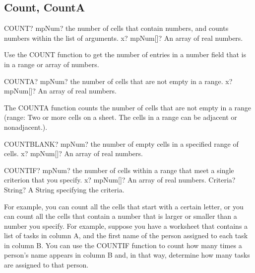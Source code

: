 \subsection{Count, CountA}

\begin{mpFunctionsExtract}
	\mpWorksheetFunctionOneNotImplemented
	{COUNT? mpNum? the number of cells that contain numbers, and counts numbers within the list of arguments.}
	{x? mpNum[]? An array of real numbers.}
\end{mpFunctionsExtract}

\vspace{0.3cm}
Use the \textsf{COUNT} function to get the number of entries in a number field that is in a range or array of numbers.


\vspace{0.6cm}
\begin{mpFunctionsExtract}
	\mpWorksheetFunctionOneNotImplemented
	{COUNTA? mpNum? the number of cells that are not empty in a range.}
	{x? mpNum[]? An array of real numbers.}
\end{mpFunctionsExtract}

\vspace{0.3cm}
The \textsf{COUNTA} function counts the number of cells that are not empty in a range (range: Two or more cells on a sheet. The cells in a range can be adjacent or nonadjacent.).


\vspace{0.6cm}
\begin{mpFunctionsExtract}
	\mpWorksheetFunctionOneNotImplemented
	{COUNTBLANK? mpNum? the number of empty cells in a specified range of cells.}
	{x? mpNum[]? An array of real numbers.}
\end{mpFunctionsExtract}



\vspace{0.6cm}
\begin{mpFunctionsExtract}
	\mpWorksheetFunctionTwoNotImplemented
	{COUNTIF? mpNum? the number of cells within a range that meet a single criterion that you specify.}
	{x? mpNum[]? An array of real numbers.}
	{Criteria? String? A String specifying the criteria.}
\end{mpFunctionsExtract}

\vspace{0.3cm}
For example, you can count all the cells that start with a certain letter, or you can count all the cells that contain a number that is larger or smaller than a number you specify. For example, suppose you have a worksheet that contains a list of tasks in column A, and the first name of the person assigned to each task in column B. You can use the \textsf{COUNTIF} function to count how many times a person's name appears in column B and, in that way, determine how many tasks are assigned to that person.



